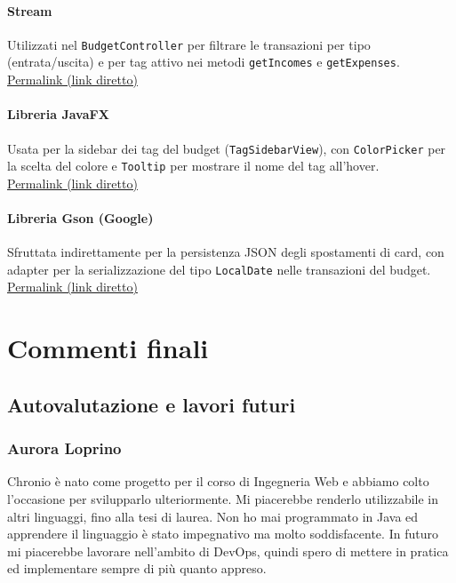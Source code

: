 \documentclass[a4paper,12pt]{report}
\begin{document}
\subsubsection{Stream}
Utilizzati nel \texttt{BudgetController} per filtrare le transazioni per tipo
(entrata/uscita) e per tag attivo nei metodi \texttt{getIncomes} e
\texttt{getExpenses}.\\
\href{https://github.com/EnricoP0421/PSS25-Chronio/blob/dev/src/main/java/com/chronio/budget/controller/BudgetController.java#L208-L213}{Permalink (link diretto)}
 
\subsubsection{Libreria JavaFX}
Usata per la sidebar dei tag del budget (\texttt{TagSidebarView}), con
\texttt{ColorPicker} per la scelta del colore e \texttt{Tooltip} per mostrare
il nome del tag all'hover.\\
\href{https://github.com/EnricoP0421/PSS25-Chronio/blob/dev/src/main/java/com/chronio/budget/view/TagSidebarView.java#L145-L152}{Permalink (link diretto)}
 
\subsubsection{Libreria Gson (Google)}
Sfruttata indirettamente per la persistenza JSON degli spostamenti di card,
con adapter per la serializzazione del tipo \texttt{LocalDate} nelle
transazioni del budget.\\
\href{https://github.com/EnricoP0421/PSS25-Chronio/blob/dev/src/main/java/com/chronio/budget/persistence/JsonBudgetRepository.java#L31-L36}{Permalink (link diretto)}

\chapter{Commenti finali}

\section{Autovalutazione e lavori futuri}

\subsection*{Aurora Loprino}

Chronio è nato come progetto per il corso di Ingegneria Web e abbiamo colto l'occasione per svilupparlo ulteriormente.
Mi piacerebbe renderlo utilizzabile in altri linguaggi, fino alla tesi di laurea.
Non ho mai programmato in Java ed apprendere il linguaggio è stato impegnativo ma molto soddisfacente. In futuro mi piacerebbe lavorare nell'ambito di DevOps, quindi spero di mettere in pratica ed implementare sempre di più quanto appreso.
\end{document}
